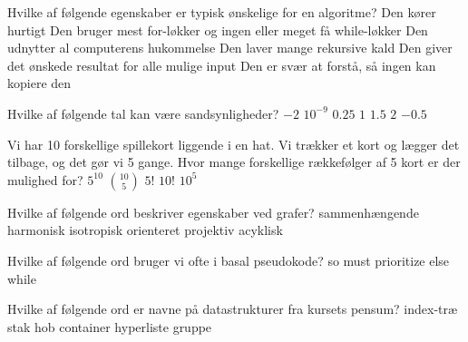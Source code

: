 \multiplechoicestart


Hvilke af følgende egenskaber er typisk ønskelige for en algoritme?
\fleresvar
\mulighederstart
\svar Den kører hurtigt \korrekt
\svar Den bruger mest for-løkker og ingen eller meget få while-løkker
\svar Den udnytter al computerens hukommelse
\svar Den laver mange rekursive kald
\svar Den giver det ønskede resultat for alle mulige input \korrekt
\svar Den er svær at forstå, så ingen kan kopiere den
\mulighederslut
{}

Hvilke af følgende tal kan være sandsynligheder?
\fleresvar
\mulighederstart
\svar $-2$
\svar $10^{-9}$ \korrekt
\svar $0.25$ \korrekt
\svar $1$ \korrekt
\svar $1.5$
\svar $2$
\svar $-0.5$
\mulighederslut
{}

Vi har 10 forskellige spillekort liggende i en hat. Vi trækker et kort og lægger det tilbage, og det gør vi 5 gange. Hvor mange forskellige rækkefølger af 5 kort er der mulighed for?
\etsvar
\mulighederstart
\svar $5^{10}$
\svar $\binom{10}{5}$
\svar $5!$
\svar $10!$
\svar $10^5$ \korrekt
\mulighederslut
{}

Hvilke af følgende ord beskriver egenskaber ved grafer?
\fleresvar
\mulighederstart
\svar sammenhængende \korrekt
\svar harmonisk
\svar isotropisk
\svar orienteret \korrekt
\svar projektiv
\svar acyklisk \korrekt
\mulighederslut
{}


Hvilke af følgende ord bruger vi ofte i basal pseudokode?
\fleresvar
\mulighederstart
\svar so
\svar must
\svar prioritize
\svar else \korrekt
\svar while \korrekt
\mulighederslut
{}


Hvilke af følgende ord er navne på datastrukturer fra kursets pensum?
\fleresvar
\mulighederstart
\svar index-træ
\svar stak \korrekt
\svar hob \korrekt
\svar container
\svar hyperliste
\svar gruppe
\mulighederslut
{}

